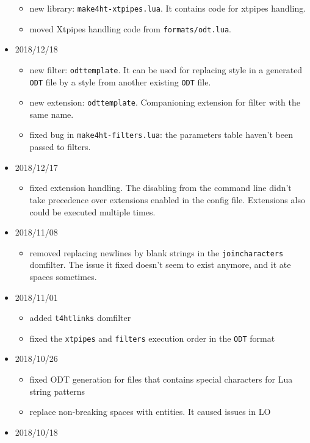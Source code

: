 \begin{itemize}
  \begin{itemize}
  \tightlist
  \item
    new library: \texttt{make4ht-xtpipes.lua}. It contains code for
    xtpipes handling.
  \item
    moved Xtpipes handling code from \texttt{formats/odt.lua}.
  \end{itemize}
\item
  2018/12/18

  \begin{itemize}
  \tightlist
  \item
    new filter: \texttt{odttemplate}. It can be used for replacing style
    in a generated \texttt{ODT} file by a style from another existing
    \texttt{ODT} file.
  \item
    new extension: \texttt{odttemplate}. Companioning extension for
    filter with the same name.
  \item
    fixed bug in \texttt{make4ht-filters.lua}: the parameters table
    haven't been passed to filters.
  \end{itemize}
\item
  2018/12/17

  \begin{itemize}
  \tightlist
  \item
    fixed extension handling. The disabling from the command line didn't
    take precedence over extensions enabled in the config file.
    Extensions also could be executed multiple times.
  \end{itemize}
\item
  2018/11/08

  \begin{itemize}
  \tightlist
  \item
    removed replacing newlines by blank strings in the
    \texttt{joincharacters} domfilter. The issue it fixed doesn't seem
    to exist anymore, and it ate spaces sometimes.
  \end{itemize}
\item
  2018/11/01

  \begin{itemize}
  \tightlist
  \item
    added \texttt{t4htlinks} domfilter
  \item
    fixed the \texttt{xtpipes} and \texttt{filters} execution order in
    the \texttt{ODT} format
  \end{itemize}
\item
  2018/10/26

  \begin{itemize}
  \tightlist
  \item
    fixed ODT generation for files that contains special characters for
    Lua string patterns
  \item
    replace non-breaking spaces with entities. It caused issues in LO
  \end{itemize}
\item
  2018/10/18


\end{itemize}
